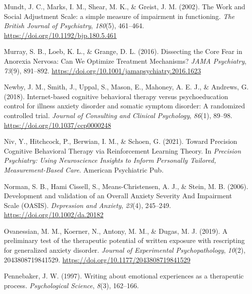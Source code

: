 \documentclass[
  man,floatsintext]{apa7}
\newlength{\cslhangindent}
\newlength{\cslentryspacingunit} %
\newenvironment{CSLReferences}[2] %
 {%
  \setlength{\parindent}{0pt}
  \ifodd #1
  \let\oldpar\par
  \def\par{\hangindent=\cslhangindent\oldpar}
  \fi
  \setlength{\parskip}{#2\cslentryspacingunit}
 }%
 {}
\begin{document}
\begin{CSLReferences}{1}{0}
\leavevmode{}%
Mundt, J. C., Marks, I. M., Shear, M. K., \& Greist, J. M. (2002). The Work and Social Adjustment Scale: a simple measure of impairment in functioning. \emph{The British Journal of Psychiatry}, \emph{180}(5), 461--464. \url{https://doi.org/10.1192/bjp.180.5.461}

\leavevmode{}%
Murray, S. B., Loeb, K. L., \& Grange, D. L. (2016). Dissecting the Core Fear in Anorexia Nervosa: Can We Optimize Treatment Mechanisms? \emph{JAMA Psychiatry}, \emph{73}(9), 891--892. \url{https://doi.org/10.1001/jamapsychiatry.2016.1623}

\leavevmode{}%
Newby, J. M., Smith, J., Uppal, S., Mason, E., Mahoney, A. E. J., \& Andrews, G. (2018). Internet-based cognitive behavioral therapy versus psychoeducation control for illness anxiety disorder and somatic symptom disorder: A randomized controlled trial. \emph{Journal of Consulting and Clinical Psychology}, \emph{86}(1), 89--98. \url{https://doi.org/10.1037/ccp0000248}

\leavevmode{}%
Niv, Y., Hitchcock, P., Berwian, I. M., \& Schoen, G. (2021). Toward Precision Cognitive Behavioral Therapy via Reinforcement Learning Theory. In \emph{Precision Psychiatry: Using Neuroscience Insights to Inform Personally Tailored, Measurement-Based Care}. American Psychiatric Pub.

\leavevmode{}%
Norman, S. B., Hami Cissell, S., Means-Christensen, A. J., \& Stein, M. B. (2006). Development and validation of an Overall Anxiety Severity And Impairment Scale (OASIS). \emph{Depression and Anxiety}, \emph{23}(4), 245--249. \url{https://doi.org/10.1002/da.20182}

\leavevmode{}%
Ovanessian, M. M., Koerner, N., Antony, M. M., \& Dugas, M. J. (2019). A preliminary test of the therapeutic potential of written exposure with rescripting for generalized anxiety disorder. \emph{Journal of Experimental Psychopathology}, \emph{10}(2), 2043808719841529. \url{https://doi.org/10.1177/2043808719841529}

\leavevmode{}%
Pennebaker, J. W. (1997). Writing about emotional experiences as a therapeutic process. \emph{Psychological Science}, \emph{8}(3), 162--166.


\end{CSLReferences}
\end{document}
